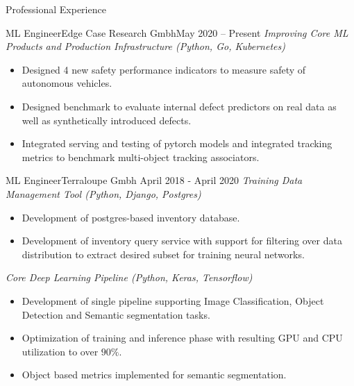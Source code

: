 \documentclass[]{mcdowellcv}
\begin{document}
    \begin{cvsection}{Professional Experience}

            \begin{cvsubsection}{ML Engineer}{Edge Case Research Gmbh}{May 2020 -- Present}
        \textit{Improving Core ML Products and Production Infrastructure (Python, Go, Kubernetes)}
            \begin{itemize}
                \item Designed 4 new safety performance indicators to measure safety of autonomous vehicles.
                \item Designed benchmark to evaluate internal defect predictors on real data as well as synthetically introduced defects.
                \item Integrated serving and testing of pytorch models and integrated tracking metrics to benchmark multi-object tracking associators.
            \end{itemize}
        \end{cvsubsection}
    
        \begin{cvsubsection}{ML Engineer}{Terraloupe Gmbh}{ April 2018 - April 2020}
            \textit{Training Data Management Tool (Python, Django, Postgres)}
            \begin{itemize}
                \item Development of postgres-based inventory database.
                \item Development of inventory query service with support for filtering over data distribution to extract desired subset for training neural networks.
            \end{itemize}
                
            \textit{Core Deep Learning Pipeline (Python, Keras, Tensorflow)}
            \begin{itemize}
                \item Development of single pipeline supporting Image Classification, Object Detection and Semantic segmentation tasks.
                \item Optimization of training and inference phase with resulting GPU and CPU utilization to over $90\%$.
                \item Object based metrics implemented for semantic segmentation.
            \end{itemize}
        \end{cvsubsection}
        

\end{cvsection}
\end{document}
